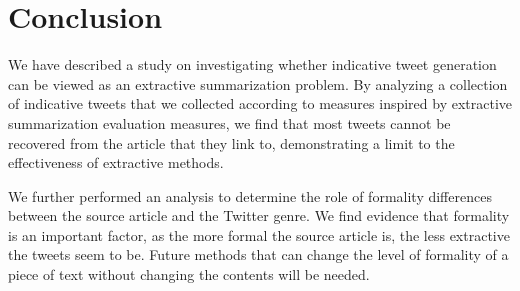 \section{Conclusion}
We have described a study on investigating whether indicative tweet generation can be viewed as an extractive summarization problem. By analyzing a collection of indicative tweets that we collected according to measures inspired by extractive summarization evaluation measures, we 
find that most tweets cannot be recovered from the article that they link to, demonstrating a limit to the effectiveness of extractive methods.

We further performed an analysis to determine the role of formality differences between the source article and the Twitter genre. We find evidence that formality is an important factor, as the more formal the source article is, the less extractive the tweets seem to be. Future methods that can change the level of formality of a piece of text without changing the contents will be needed.